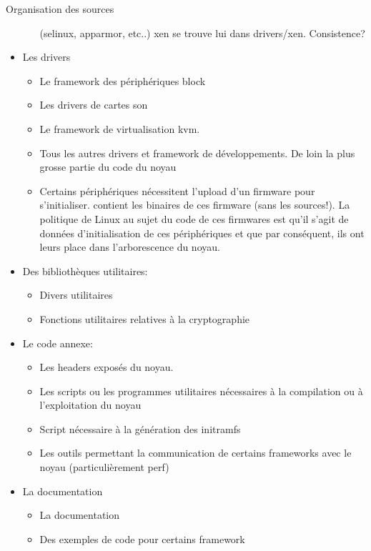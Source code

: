 \begin{frame}[fragile=singleslide]{Organisation des sources}
\begin{itemize}
\begin{itemize}
      (selinux, apparmor,  etc..)  \note[item] xen se  trouve lui dans
      drivers/xen. Consistence?
    \end{itemize} 
  \item Les drivers
    \begin{itemize} 
    \item {} Le framework des périphériques block
    \item {} Les drivers de cartes son
    \item {} Le framework de virtualisation kvm.
    \item  {} Tous  les autres  drivers et  framework de
      développements. De loin la plus grosse partie du code du noyau
    \item {}  Certains périphériques nécessitent l'upload
      d'un firmware  pour s'initialiser.   contient les
      binaires de  ces firmware (sans  les sources!). La  politique de
      Linux  au sujet du  code de  ces firmwares  est qu'il  s'agit de
      données  d'initialisation  de   ces  périphériques  et  que  par
      conséquent, ils ont leurs place dans l'arborescence du noyau.
    \end{itemize} 
  \item Des bibliothèques utilitaires:
    \begin{itemize} 
    \item {} Divers utilitaires
    \item   {}  Fonctions   utilitaires   relatives  à   la
      cryptographie
    \end{itemize} 
  \item Le code annexe:
    \begin{itemize} 
    \item {} Les headers exposés du noyau.
    \item  {} Les  scripts ou  les  programmes utilitaires
      nécessaires à la compilation ou à l'exploitation du noyau
    \item {} Script nécessaire à la génération des initramfs
    \item  {}  Les  outils  permettant la  communication  de
      certains frameworks avec le noyau (particulièrement perf)
    \end{itemize} 
  \item La documentation
    \begin{itemize} 
    \item {} La documentation
    \item {} Des exemples de code pour certains framework
    \end{itemize} 
  \end{itemize} 
\end{frame} 

